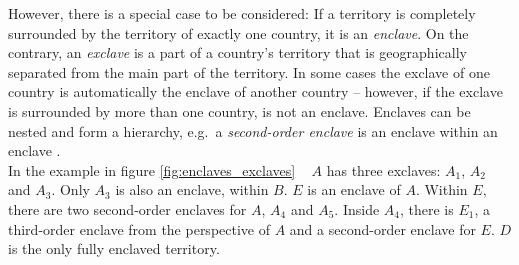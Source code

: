 \vspace{-0.5em}
\begin{minipage}[t]{0.62\textwidth}

However, there is a special case to be considered:
If a territory is completely surrounded by the territory of exactly one country, it is an \emph{enclave}. On the contrary, an \emph{exclave} is a part of a country's territory that is geographically separated from the main part of the territory. In some cases the exclave of one country is automatically the enclave of another country -- however, if the exclave is surrounded by more than one country, is not an enclave. Enclaves can be nested and form a hierarchy, e.g.\ a \emph{second-order enclave} is an enclave within an enclave
\cite{enclavesexclaves}. \\[-0.6em]

In the example in figure \ref{fig:enclaves_exclaves} ~ $A$ has three exclaves: $A_1$, $A_2$ and $A_3$. Only $A_3$ is also an enclave, within $B$. $E$ is an enclave of $A$. Within $E$, there are two second-order enclaves for $A$, $A_4$ and $A_5$. Inside $A_4$, there is $E_1$, a third-order enclave from the perspective of $A$ and a second-order enclave for $E$. $D$ is the only fully enclaved territory.

\end{minipage}             %
\hspace{0.04\textwidth}    %
